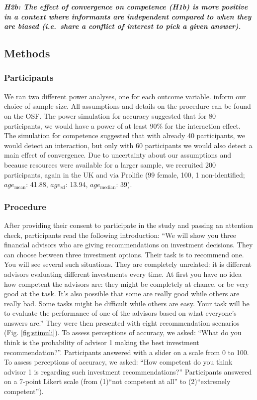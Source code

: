 \documentclass[
  doc,floatsintext]{apa6}
\begin{document}
\textbf{\emph{H2b: The effect of convergence on competence (H1b) is more positive in a context where informants are independent compared to when they are biased (i.e.~share a conflict of interest to pick a given answer).}}

\hypertarget{methods-1}{%
\subsection{Methods}\label{methods-1}}

\hypertarget{participants-1}{%
\subsubsection{Participants}\label{participants-1}}

We ran two different power analyses, one for each outcome variable. inform our choice of sample size. All assumptions and details on the procedure can be found on the OSF. The power simulation for accuracy suggested that for 80 participants, we would have a power of at least 90\% for the interaction effect. The simulation for competence suggested that with already 40 participants, we would detect an interaction, but only with 60 participants we would also detect a main effect of convergence. Due to uncertainty about our assumptions and because resources were available for a larger sample, we recruited 200 participants, again in the UK and via Prolific (99 female, 100, 1 non-identified; \(age_\text{mean}\): 41.88, \(age_\text{sd}\): 13.94, \(age_\text{median}\): 39).

\hypertarget{procedure-1}{%
\subsubsection{Procedure}\label{procedure-1}}

After providing their consent to participate in the study and passing an attention check, participants read the following introduction: ``We will show you three financial advisors who are giving recommendations on investment decisions. They can choose between three investment options. Their task is to recommend one. You will see several such situations. They are completely unrelated: it is different advisors evaluating different investments every time. At first you have no idea how competent the advisors are: they might be completely at chance, or be very good at the task. It's also possible that some are really good while others are really bad. Some tasks might be difficult while others are easy. Your task will be to evaluate the performance of one of the advisors based on what everyone's answers are.'' They were then presented with eight recommendation scenarios (Fig. \ref{fig:stimuli}). To assess perceptions of accuracy, we asked: ``What do you think is the probability of advisor 1 making the best investment recommendation?''. Participants answered with a slider on a scale from 0 to 100. To assess perceptions of accuracy, we asked: ``How competent do you think advisor 1 is regarding such investment recommendations?'' Participants answered on a 7-point Likert scale (from (1)``not competent at all'' to (2)``extremely competent'').
\end{document}
